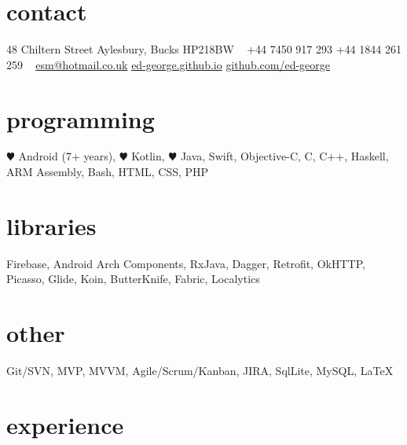 \documentclass[]{friggeri-cv} %
\begin{document}


\begin{aside} %
\section{contact}
48 Chiltern Street
Aylesbury, Bucks
HP218BW
~
+44 7450 917 293
+44 1844 261 259
~
\href{mailto:esm@hotmail.co.uk}{esm@hotmail.co.uk}
\href{http://ed-george.github.io}{ed-george.github.io}
\href{http://github.com/ed-george}{github.com/ed-george}
\section{programming}
{\color{red} $\varheartsuit$} Android (7+ years), {\color{red} $\varheartsuit$} Kotlin, 
{\color{red} $\varheartsuit$} Java, Swift, Objective-C, C, C++, Haskell, ARM Assembly, Bash, HTML, CSS, PHP
\section{libraries}
Firebase, Android Arch Components, RxJava, Dagger, Retrofit, OkHTTP, Picasso, Glide, Koin, ButterKnife, Fabric, Localytics
\section{other}
Git/SVN, MVP, MVVM, Agile/Scrum/Kanban, JIRA, SqlLite, MySQL, \LaTeX
\end{aside}


\section{experience}
\end{document}
